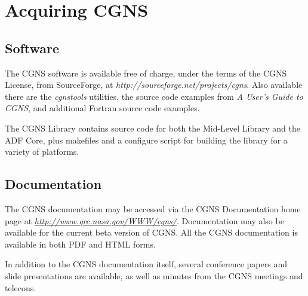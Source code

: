 \section{Acquiring CGNS}
\label{s:acquiring}
\thispagestyle{plain}

\subsection{Software}

The CGNS software is available free of charge, under the terms of the
CGNS License, from SourceForge, at
\textit{http://sourceforge.net/projects/cgns}.
Also available there are the \textit{cgnstools} utilities, the source
code examples from \textit{A User's Guide to CGNS}, and additional
Fortran source code examples.

The CGNS Library contains source code for both the Mid-Level Library and
the ADF Core, plus makefiles and a configure script for building the
library for a variety of platforms.

\subsection{Documentation}

The CGNS documentation may be accessed via the CGNS Documentation home
page at {\itshape\url{http://www.grc.nasa.gov/WWW/cgns/}}.
Documentation may also be available for the current beta version of CGNS.
All the CGNS documentation is available in both PDF and HTML forms.

In addition to the CGNS documentation itself, several conference papers
and slide presentations are available, as well as minutes from the CGNS
meetings and telecons.
